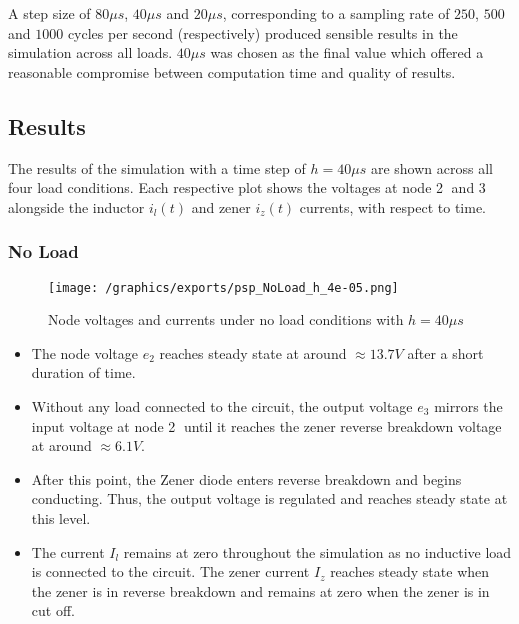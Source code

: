 A step size of $80\mu s$, $40 \mu s$ and $20 \mu s$, corresponding to a sampling rate of $250$, $500$ and $1000$ cycles per second (respectively) produced sensible results in the simulation across all loads. $40 \mu s$ was chosen as the final value which offered a reasonable compromise between computation time and quality of results. 

\pagebreak
\subsection{Results}
The results of the simulation with a time step of $h = 40 \mu s$ are shown across all four load conditions. Each respective plot shows the voltages at node \textcircled{2} and \textcircled{3} alongside the inductor $i_l(t)$ and zener $i_z(t)$ currents, with respect to time.

\subsubsection{No Load}
\begin{figure}[H]
    \centering
    \texttt{[image: /graphics/exports/psp\_NoLoad\_h\_4e-05.png]}
    \caption{Node voltages and currents under no load conditions with $h=40\mu s$}
\end{figure}
\begin{itemize}
\item The node voltage $e_2$ reaches steady state at around $\approx 13.7V$ after a short duration of time.
\item Without any load connected to the circuit, the output voltage $e_3$ mirrors the input voltage at node \textcircled{2} until it reaches the zener reverse breakdown voltage at around $\approx 6.1V$.
\item After this point, the Zener diode enters reverse breakdown and begins conducting. Thus, the output voltage is regulated and reaches steady state at this level.
\item The current $I_l$ remains at zero throughout the simulation as no inductive load is connected to the circuit. The zener current $I_z$ reaches steady state when the zener is in reverse breakdown and remains at zero when the zener is in cut off.
\end{itemize}

